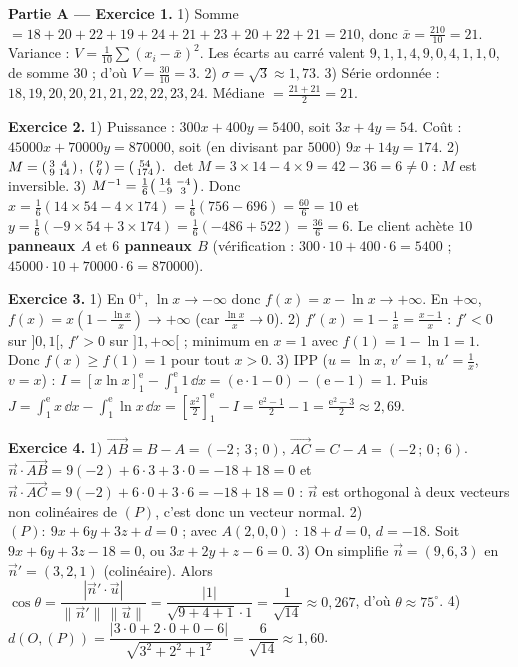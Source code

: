 
\noindent\textbf{Partie A — Exercice 1.}
1) Somme $=18{+}20{+}22{+}19{+}24{+}21{+}23{+}20{+}22{+}21=210$, donc $\bar x=\frac{210}{10}=21$.
Variance : $V=\frac1{10}\sum(x_i-\bar x)^2$. Les écarts au carré valent
$9,1,1,4,9,0,4,1,1,0$, de somme $30$ ; d'où $V=\frac{30}{10}=3$.
2) $\sigma=\sqrt3\approx1{,}73$.
3) Série ordonnée : $18,19,20,20,21,21,22,22,23,24$. Médiane $=\frac{21+21}{2}=21$.

\noindent\textbf{Exercice 2.}
1) Puissance : $300x+400y=5400$, soit $3x+4y=54$. Coût : $45000x+70000y=870000$,
soit (en divisant par $5000$) $9x+14y=174$.
2) $M=\begin{psmallmatrix}3&4\\9&14\end{psmallmatrix}$, $\begin{psmallmatrix}p\\q\end{psmallmatrix}=\begin{psmallmatrix}54\\174\end{psmallmatrix}$.
$\det M=3\times14-4\times9=42-36=6\neq0$ : $M$ est inversible.
3) $M^{-1}=\frac16\begin{psmallmatrix}14&-4\\-9&3\end{psmallmatrix}$. Donc
$x=\frac16(14\times54-4\times174)=\frac16(756-696)=\frac{60}{6}=10$ et
$y=\frac16(-9\times54+3\times174)=\frac16(-486+522)=\frac{36}{6}=6$.
Le client achète \textbf{$10$ panneaux $A$} et \textbf{$6$ panneaux $B$}
(vérification : $300\cdot10+400\cdot6=5400$ ; $45000\cdot10+70000\cdot6=870000$).

\noindent\textbf{Exercice 3.}
1) En $0^+$, $\ln x\to-\infty$ donc $f(x)=x-\ln x\to+\infty$. En $+\infty$,
$f(x)=x(1-\frac{\ln x}{x})\to+\infty$ (car $\frac{\ln x}{x}\to0$).
2) $f'(x)=1-\frac1x=\frac{x-1}{x}$ : $f'<0$ sur $]0,1[$, $f'>0$ sur $]1,+\infty[$ ; minimum en $x=1$
avec $f(1)=1-\ln1=1$. Donc $f(x)\ge f(1)=1$ pour tout $x>0$.
3) IPP ($u=\ln x$, $v'=1$, $u'=\frac1x$, $v=x$) :
$I=[x\ln x]_1^{\mathrm e}-\int_1^{\mathrm e}1\,\dd x=(\mathrm e\cdot1-0)-(\mathrm e-1)=1$.
Puis $J=\int_1^{\mathrm e}x\,\dd x-\int_1^{\mathrm e}\ln x\,\dd x=[\frac{x^2}{2}]_1^{\mathrm e}-I
=\frac{\mathrm e^2-1}{2}-1=\frac{\mathrm e^2-3}{2}\approx2{,}69$.

\noindent\textbf{Exercice 4.}
1) $\vec{AB}=B-A=(-2\,;\,3\,;\,0)$, $\vec{AC}=C-A=(-2\,;\,0\,;\,6)$.
$\vec n\cdot\vec{AB}=9(-2)+6\cdot3+3\cdot0=-18+18=0$ et
$\vec n\cdot\vec{AC}=9(-2)+6\cdot0+3\cdot6=-18+18=0$ : $\vec n$ est orthogonal à deux vecteurs
non colinéaires de $(P)$, c'est donc un vecteur normal.
2) $(P)\!:\ 9x+6y+3z+d=0$ ; avec $A(2,0,0)$ : $18+d=0$, $d=-18$. Soit $9x+6y+3z-18=0$,
ou $3x+2y+z-6=0$.
3) On simplifie $\vec n=(9,6,3)$ en $\vec n'=(3,2,1)$ (colinéaire). Alors
$\cos\theta=\dfrac{|\vec n'\cdot\vec u|}{\|\vec n'\|\,\|\vec u\|}=\dfrac{|1|}{\sqrt{9+4+1}\cdot1}=\dfrac{1}{\sqrt{14}}\approx0{,}267$,
d'où $\theta\approx75^{\circ}$.
4) $d(O,(P))=\dfrac{|3\cdot0+2\cdot0+0-6|}{\sqrt{3^2+2^2+1^2}}=\dfrac{6}{\sqrt{14}}\approx1{,}60$.

